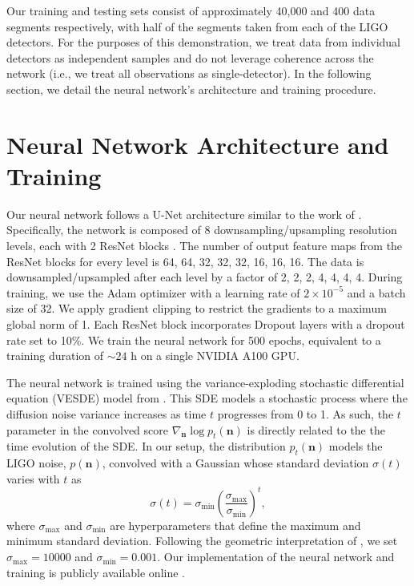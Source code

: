\documentclass[twocolumn]{aastex631}
\begin{document}
Our training and testing sets consist of approximately 40,000 and 400 data segments respectively, with half of the segments taken from each of the LIGO detectors. For the purposes of this demonstration, we treat data from individual detectors as independent samples and do not leverage coherence across the network (i.e., we treat all observations as single-detector). In the following section, we detail the neural network's architecture and training procedure.






\section{Neural Network Architecture and Training}
\label{sec:neural_network}

Our neural network follows a U-Net architecture similar to the work of \cite{song2020sde}. Specifically, the network is composed of 8 downsampling/upsampling resolution levels, each with 2 ResNet blocks \citep{Brock2018}. The number of output feature maps from the ResNet blocks for every level is 64, 64, 32, 32, 32, 16, 16, 16. The data is downsampled/upsampled after each level by a factor of  2, 2, 2, 4, 4, 4, 4. During training, we use the Adam optimizer \citep{kingma2014adam} with a learning rate of \(2 \times 10^{-5}\) and a batch size of 32. We apply gradient clipping to restrict the gradients to a maximum global norm of 1. Each ResNet block incorporates Dropout layers \citep{Dropout2014} with a dropout rate set to 10\%. We train the neural network for 500 epochs, equivalent to a training duration of ${\sim}24$ h on a single NVIDIA A100 GPU.


The neural network is trained using the variance-exploding stochastic differential equation (VESDE) model from \cite{song2020sde}. This SDE models a stochastic process where the diffusion noise variance increases as time $t$ progresses from 0 to 1. As such, the $t$ parameter in the convolved score $\nabla_{\boldsymbol{n}} \log p_t(\boldsymbol{n})$ is directly related to the the time evolution of the SDE. In our setup, the distribution $p_{t}(\boldsymbol{n})$ models the LIGO noise, $p(\boldsymbol{n})$, convolved with a Gaussian whose standard deviation $\sigma(t)$ varies with $t$ as
\begin{equation}
    \sigma(t) = \sigma_{\text{min}} \left(\frac{\sigma_{\text{max}}}{\sigma_{\text{min}}}\right)^t,
\end{equation}
where $\sigma_{\text{max}}$ and $\sigma_{\text{min}}$ are hyperparameters that define the maximum and minimum standard deviation. Following the geometric interpretation of \cite{song2020sde}, we set $\sigma_{\text{max}} = 10000$ and $\sigma_{\text{min}} = 0.001$. Our implementation of the neural network and training is publicly available online \citep{scoregen_jax}.
\end{document}
